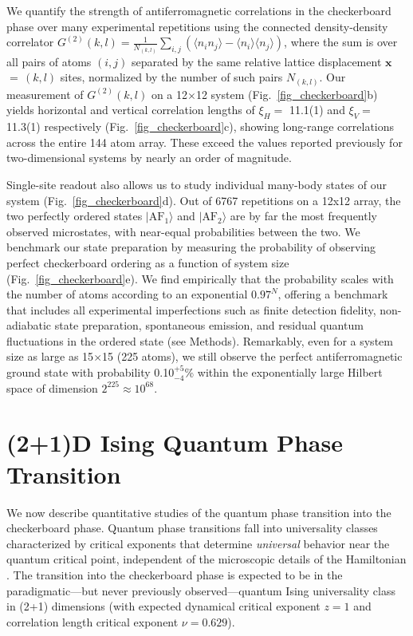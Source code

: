 \documentclass[reprint,twocolumn,secnumarabic,amssymb, aps, prl]{revtex4-1}
\begin{document}
We quantify the strength of antiferromagnetic correlations in the checkerboard phase over many experimental repetitions using the connected density-density correlator $G^{(2)}(k,l) = \frac{1}{N_{(k,l)}} \sum_{i,j} (\langle n_i n_j\rangle - \langle n_i\rangle \langle n_j\rangle)$, where the sum is over all pairs of atoms $(i,j)$ separated by the same relative lattice displacement $\mathbf{x}$\,$=$\,$(k,l)$ sites, normalized by the number of such pairs $N_{(k,l)}$. Our measurement of $G^{(2)}(k,l)$ on a 12$\times$12 system (Fig.~\ref{fig_checkerboard}b) yields horizontal and vertical correlation lengths of $\xi_H = $ 11.1(1) and $\xi_V = $ 11.3(1) respectively (Fig.~\ref{fig_checkerboard}c), showing long-range correlations across the entire 144 atom array. These exceed the values reported previously for two-dimensional systems \cite{AntoineAdiabatic2017, WaseemAdiabatic2017} by nearly an order of magnitude.

Single-site readout also allows us to study individual many-body states of our system (Fig.~\ref{fig_checkerboard}d). Out of 6767 repetitions on a 12x12 array, the two perfectly ordered states $|\text{AF}_1\rangle$ and $|\text{AF}_2\rangle$ are by far the most frequently observed microstates, with near-equal probabilities between the two. We benchmark our state preparation by measuring the probability of observing perfect checkerboard ordering as a function of system size (Fig.~\ref{fig_checkerboard}e). We find empirically that the probability scales with the number of atoms according to an exponential $0.97^N$, offering a benchmark that includes all experimental imperfections such as finite detection fidelity, non-adiabatic state preparation, spontaneous emission, and residual quantum fluctuations in the ordered state (see Methods). Remarkably, even for a system size as large as 15$\times$15 (225 atoms), we still observe the perfect antiferromagnetic ground state with probability 0.10${^{+5}_{-4}}$\% within the exponentially large Hilbert space of dimension $2^{225} \approx 10^{68}$. 

\section{(2+1)D Ising Quantum Phase Transition}
We now describe quantitative studies of the quantum phase transition into the checkerboard phase. Quantum phase transitions fall into universality classes characterized by critical exponents that determine \textit{universal} behavior near the quantum critical point, independent of the microscopic details of the Hamiltonian \cite{SachdevQPT}. The transition into the checkerboard phase is expected to be in the paradigmatic---but never previously observed---quantum Ising universality class in (2+1) dimensions \cite{Rhine2020} (with expected dynamical critical exponent $z=1$ and correlation length critical exponent $\nu = 0.629$).
\end{document}
